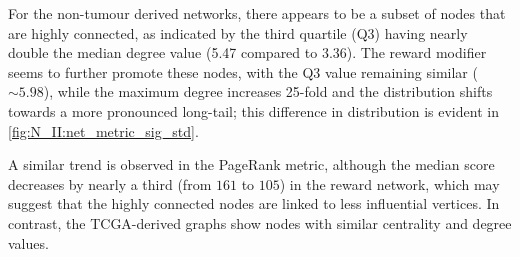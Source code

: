For the non-tumour derived networks, there appears to be a subset of nodes that are highly connected, as indicated by the third quartile (Q3) having nearly double the median degree value (5.47 compared to 3.36). The reward modifier seems to further promote these nodes, with the Q3 value remaining similar ($\sim5.98$), while the maximum degree increases 25-fold and the distribution shifts towards a more pronounced long-tail; this difference in distribution is evident in \cref{fig:N_II:net_metric_sig_std}.

A similar trend is observed in the PageRank metric, although the median score decreases by nearly a third (from $161$ to $105$) in the reward network, which may suggest that the highly connected nodes are linked to less influential vertices. In contrast, the TCGA-derived graphs show nodes with similar centrality and degree values.





